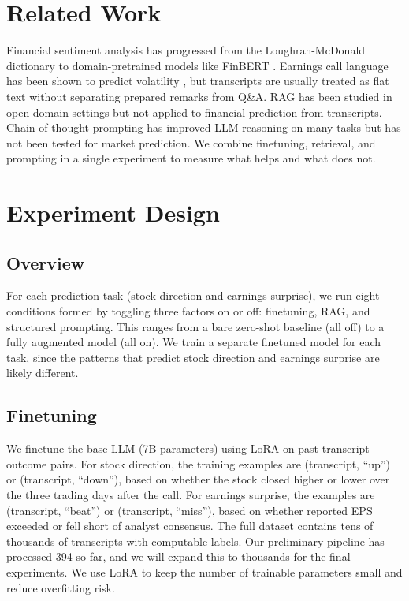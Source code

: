 \documentclass[11pt]{article}
\begin{document}
\section{Related Work}

Financial sentiment analysis has progressed from the Loughran-McDonald dictionary \citep{Loughran2011} to domain-pretrained models like FinBERT \citep{Araci2019}. Earnings call language has been shown to predict volatility \citep{Qin2019}, but transcripts are usually treated as flat text without separating prepared remarks from Q\&A. RAG has been studied in open-domain settings \citep{Lewis2020} but not applied to financial prediction from transcripts. Chain-of-thought prompting \citep{Wei2022} has improved LLM reasoning on many tasks but has not been tested for market prediction. We combine finetuning, retrieval, and prompting in a single experiment to measure what helps and what does not.

\section{Experiment Design}

\subsection{Overview}

For each prediction task (stock direction and earnings surprise), we run eight conditions formed by toggling three factors on or off: finetuning, RAG, and structured prompting. This ranges from a bare zero-shot baseline (all off) to a fully augmented model (all on). We train a separate finetuned model for each task, since the patterns that predict stock direction and earnings surprise are likely different.

\subsection{Finetuning}

We finetune the base LLM (7B parameters) using LoRA \citep{Hu2022} on past transcript-outcome pairs. For stock direction, the training examples are (transcript, ``up'') or (transcript, ``down''), based on whether the stock closed higher or lower over the three trading days after the call. For earnings surprise, the examples are (transcript, ``beat'') or (transcript, ``miss''), based on whether reported EPS exceeded or fell short of analyst consensus. The full dataset contains tens of thousands of transcripts with computable labels. Our preliminary pipeline has processed 394 so far, and we will expand this to thousands for the final experiments. We use LoRA to keep the number of trainable parameters small and reduce overfitting risk.
\end{document}
